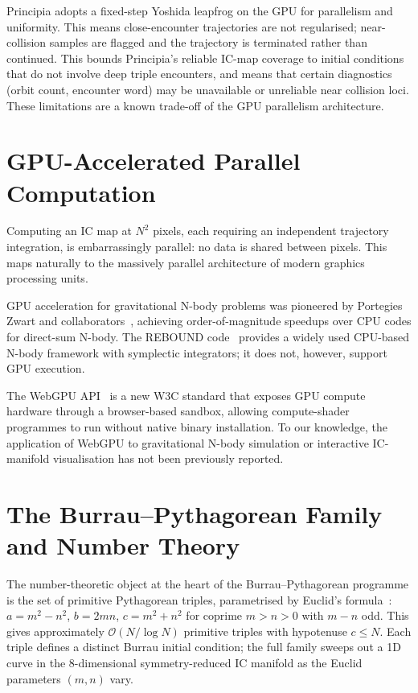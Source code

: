 \documentclass[11pt,a4paper]{article}
\begin{document}
Principia adopts a fixed-step Yoshida leapfrog on the GPU for parallelism and uniformity.
This means close-encounter trajectories are not regularised; near-collision samples are
flagged and the trajectory is terminated rather than continued.  This bounds Principia's
reliable IC-map coverage to initial conditions that do not involve deep triple encounters,
and means that certain diagnostics (orbit count, encounter word) may be unavailable or
unreliable near collision loci.  These limitations are a known trade-off of the GPU
parallelism architecture.

\section{GPU-Accelerated Parallel Computation}

Computing an IC map at $N^2$ pixels, each requiring an independent trajectory integration, is
embarrassingly parallel: no data is shared between pixels.  This maps naturally to the massively
parallel architecture of modern graphics processing units.

GPU acceleration for gravitational N-body problems was pioneered by Portegies Zwart and
collaborators~\cite{portegies2007}, achieving order-of-magnitude speedups over CPU codes for
direct-sum N-body.  The REBOUND code~\cite{rein2012} provides a widely used CPU-based N-body
framework with symplectic integrators; it does not, however, support GPU execution.

The WebGPU API~\cite{webgpu2024} is a new W3C standard that exposes GPU compute hardware
through a browser-based sandbox, allowing compute-shader programmes to run without native
binary installation.  To our knowledge, the application of WebGPU to gravitational N-body
simulation or interactive IC-manifold visualisation has not been previously reported.

\section{The Burrau--Pythagorean Family and Number Theory}
\label{sec:number_theory}

The number-theoretic object at the heart of the Burrau--Pythagorean programme is the set of
primitive Pythagorean triples, parametrised by Euclid's formula~\cite{hardy1979}:
$a = m^2-n^2$, $b = 2mn$, $c = m^2+n^2$ for coprime $m>n>0$ with $m-n$ odd.  This gives
approximately $\mathcal{O}(N/\log N)$ primitive triples with hypotenuse $c \leq N$.  Each
triple defines a distinct Burrau initial condition; the full family sweeps out a 1D curve in
the 8-dimensional symmetry-reduced IC manifold as the Euclid parameters $(m,n)$ vary.
\end{document}
